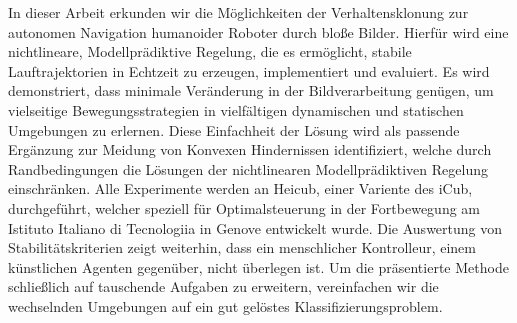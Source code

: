 In dieser Arbeit erkunden wir die Möglichkeiten der Verhaltensklonung zur autonomen Navigation humanoider Roboter durch bloße Bilder. Hierfür wird eine nichtlineare, Modellprädiktive Regelung, die es ermöglicht, stabile Lauftrajektorien in Echtzeit zu erzeugen, implementiert und evaluiert. Es wird demonstriert, dass minimale Veränderung in der Bildverarbeitung genügen, um vielseitige Bewegungsstrategien in vielfältigen dynamischen und statischen Umgebungen zu erlernen. Diese Einfachheit der Lösung wird als passende Ergänzung zur Meidung von Konvexen Hindernissen identifiziert, welche durch Randbedingungen die Lösungen der nichtlinearen Modellprädiktiven Regelung einschränken. Alle Experimente werden an Heicub, einer Variente des iCub, durchgeführt, welcher speziell für Optimalsteuerung in der Fortbewegung am Istituto Italiano di Tecnologiia in Genove entwickelt wurde. Die Auswertung von Stabilitätskriterien zeigt weiterhin, dass ein menschlicher Kontrolleur, einem künstlichen Agenten gegenüber, nicht überlegen ist. Um die präsentierte Methode schließlich auf tauschende Aufgaben zu erweitern, vereinfachen wir die wechselnden Umgebungen auf ein gut gelöstes Klassifizierungsproblem.